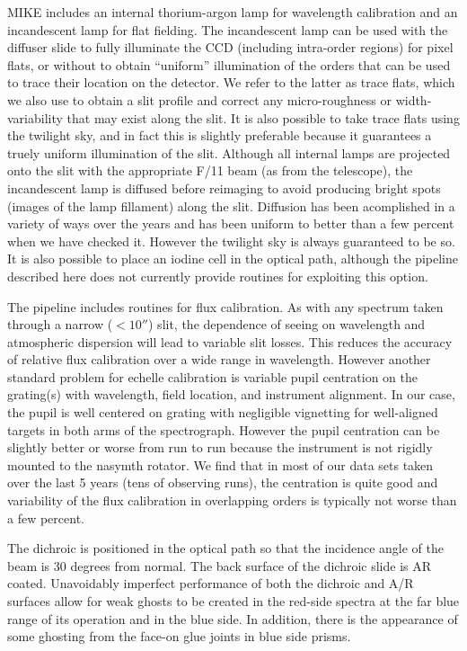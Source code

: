 \documentclass[12pt,preprint]{aastex}
\begin{document}
MIKE includes an internal thorium-argon lamp for wavelength
calibration and an incandescent lamp for flat fielding.  The
incandescent lamp can be used with the diffuser slide to fully
illuminate the CCD (including intra-order regions) for pixel flats, or
without to obtain ``uniform'' illumination of the orders that can be
used to trace their location on the detector.  We refer to the latter
as trace flats, which we also use to obtain a slit profile and correct
any micro-roughness or width-variability that may exist along the
slit.  It is also possible to take trace flats using the twilight sky,
and in fact this is slightly preferable because it guarantees a truely
uniform illumination of the slit.  Although all internal lamps are
projected onto the slit with the appropriate F/11 beam (as from the
telescope), the incandescent lamp is diffused before reimaging to
avoid producing bright spots (images of the lamp fillament) along the
slit.  Diffusion has been acomplished in a variety of ways over the
years and has been uniform to better than a few percent when we have
checked it.  However the twilight sky is always guaranteed to be so.
It is also possible to place an iodine cell in the optical path, although
the pipeline described here does not currently
provide routines for exploiting this option.

The pipeline includes routines for flux calibration.  As with any
spectrum taken through a narrow ($<10''$) slit, the dependence of
seeing on wavelength and atmospheric dispersion
will lead to variable slit losses.  This reduces
the accuracy of relative flux calibration over a wide range in
wavelength. However another standard problem for echelle calibration
is variable pupil centration on the grating(s) with wavelength, field
location, and instrument alignment.  In our case, the pupil is well
centered on grating with negligible vignetting for well-aligned
targets in both arms of the spectrograph.  However the pupil
centration can be slightly better or worse from run to run because the
instrument is not rigidly mounted to the nasymth rotator.  We find
that in most of our data sets taken over the last 5 years (tens of
observing runs), the centration is quite good and variability of the
flux calibration in overlapping orders is typically not worse than a
few percent.

The dichroic is positioned in the optical path so that the incidence
angle of the beam is 30 degrees from normal.  The back surface of the
dichroic slide is AR coated. Unavoidably imperfect performance of both
the dichroic and A/R surfaces allow for weak ghosts to be created in
the red-side spectra at the far blue range of its operation and in the
blue side.  In addition, there is the appearance of some ghosting from 
the face-on glue joints in blue side prisms.
\end{document}
